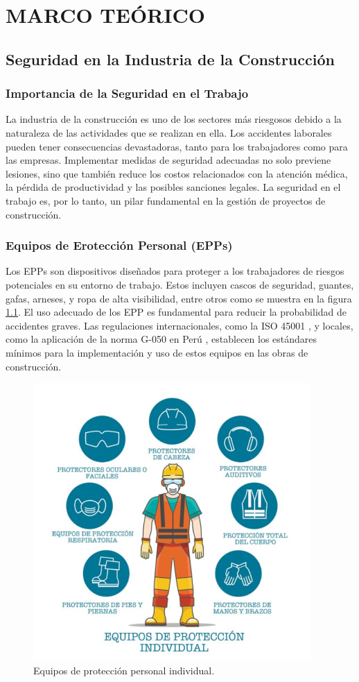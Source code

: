\chapter{MARCO TEÓRICO}

\section{Seguridad en la Industria de la Construcción}

\subsection{Importancia de la Seguridad en el Trabajo}

La industria de la construcción es uno de los sectores más riesgosos debido a la naturaleza de las actividades que se realizan en ella. Los accidentes laborales pueden tener consecuencias devastadoras, tanto para los trabajadores como para las empresas. Implementar medidas de seguridad adecuadas no solo previene lesiones, sino que también reduce los costos relacionados con la atención médica, la pérdida de productividad y las posibles sanciones legales. La seguridad en el trabajo es, por lo tanto, un pilar fundamental en la gestión de proyectos de construcción.

\subsection{Equipos de Erotección Personal (EPPs)}
Los EPPs son dispositivos diseñados para proteger a los trabajadores de riesgos potenciales en su entorno de trabajo. Estos incluyen cascos de seguridad, guantes, gafas, arneses, y ropa de alta visibilidad, entre otros como se muestra en la figura \ref{fig:epp}. El uso adecuado de los EPP es fundamental para reducir la probabilidad de accidentes graves. Las regulaciones internacionales, como la ISO 45001 \cite{darabont2017key}, y locales, como la aplicación de la norma G-050 en Perú \cite{martinez2017aplicacion}, establecen los estándares mínimos para la implementación y uso de estos equipos en las obras de construcción.

\begin{figure}[!ht]
  \centering
  \includegraphics[width=.49\linewidth]{images/epp.jpg}
  \caption{Equipos de protección personal individual.}
  \label{fig:epp}
\end{figure}


